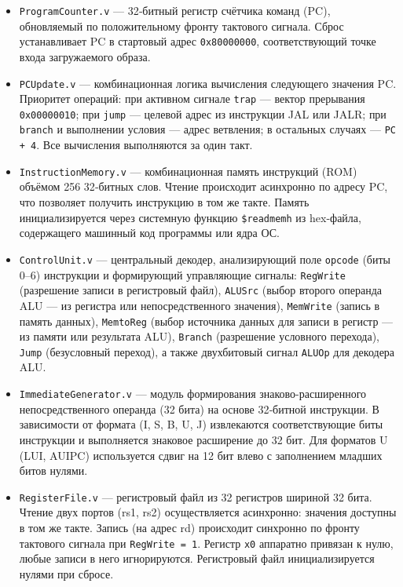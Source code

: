 \begin{itemize}
  \item \texttt{ProgramCounter.v} — 32‑битный регистр счётчика команд (PC), обновляемый по положительному фронту тактового сигнала. Сброс устанавливает PC в стартовый адрес \texttt{0x80000000}, соответствующий точке входа загружаемого образа.
  \item \texttt{PCUpdate.v} — комбинационная логика вычисления следующего значения PC. Приоритет операций: при активном сигнале \texttt{trap} — вектор прерывания \texttt{0x00000010}; при \texttt{jump} — целевой адрес из инструкции JAL или JALR; при \texttt{branch} и выполнении условия — адрес ветвления; в остальных случаях — \texttt{PC + 4}. Все вычисления выполняются за один такт.
  \item \texttt{InstructionMemory.v} — комбинационная память инструкций (ROM) объёмом 256 32‑битных слов. Чтение происходит асинхронно по адресу PC, что позволяет получить инструкцию в том же такте. Память инициализируется через системную функцию \texttt{\$readmemh} из hex-файла, содержащего машинный код программы или ядра ОС.
  \item \texttt{ControlUnit.v} — центральный декодер, анализирующий поле \texttt{opcode} (биты 0–6) инструкции и формирующий управляющие сигналы: \texttt{RegWrite} (разрешение записи в регистровый файл), \texttt{ALUSrc} (выбор второго операнда ALU — из регистра или непосредственного значения), \texttt{MemWrite} (запись в память данных), \texttt{MemtoReg} (выбор источника данных для записи в регистр — из памяти или результата ALU), \texttt{Branch} (разрешение условного перехода), \texttt{Jump} (безусловный переход), а также двухбитовый сигнал \texttt{ALUOp} для декодера ALU.
  \item \texttt{ImmediateGenerator.v} — модуль формирования знаково-расширенного непосредственного операнда (32 бита) на основе 32‑битной инструкции. В зависимости от формата (I, S, B, U, J) извлекаются соответствующие биты инструкции и выполняется знаковое расширение до 32 бит. Для форматов U (LUI, AUIPC) используется сдвиг на 12 бит влево с заполнением младших битов нулями.
  \item \texttt{RegisterFile.v} — регистровый файл из 32 регистров шириной 32 бита. Чтение двух портов (rs1, rs2) осуществляется асинхронно: значения доступны в том же такте. Запись (на адрес rd) происходит синхронно по фронту тактового сигнала при \texttt{RegWrite = 1}. Регистр \texttt{x0} аппаратно привязан к нулю, любые записи в него игнорируются. Регистровый файл инициализируется нулями при сбросе.

\end{itemize}
